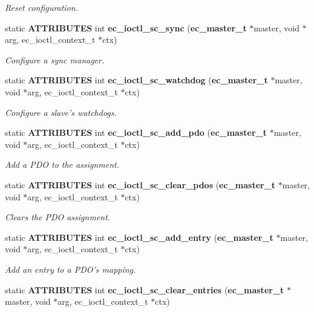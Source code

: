 \begin{DoxyCompactItemize}
\begin{DoxyCompactList}\small\item\em Reset configuration. \end{DoxyCompactList}\item 
static {\bf A\-T\-T\-R\-I\-B\-U\-T\-E\-S} int {\bf ec\-\_\-ioctl\-\_\-sc\-\_\-sync} ({\bf ec\-\_\-master\-\_\-t} $\ast$master, void $\ast$arg, ec\-\_\-ioctl\-\_\-context\-\_\-t $\ast$ctx)
\begin{DoxyCompactList}\small\item\em Configure a sync manager. \end{DoxyCompactList}\item 
static {\bf A\-T\-T\-R\-I\-B\-U\-T\-E\-S} int {\bf ec\-\_\-ioctl\-\_\-sc\-\_\-watchdog} ({\bf ec\-\_\-master\-\_\-t} $\ast$master, void $\ast$arg, ec\-\_\-ioctl\-\_\-context\-\_\-t $\ast$ctx)
\begin{DoxyCompactList}\small\item\em Configure a slave's watchdogs. \end{DoxyCompactList}\item 
static {\bf A\-T\-T\-R\-I\-B\-U\-T\-E\-S} int {\bf ec\-\_\-ioctl\-\_\-sc\-\_\-add\-\_\-pdo} ({\bf ec\-\_\-master\-\_\-t} $\ast$master, void $\ast$arg, ec\-\_\-ioctl\-\_\-context\-\_\-t $\ast$ctx)
\begin{DoxyCompactList}\small\item\em Add a P\-D\-O to the assignment. \end{DoxyCompactList}\item 
static {\bf A\-T\-T\-R\-I\-B\-U\-T\-E\-S} int {\bf ec\-\_\-ioctl\-\_\-sc\-\_\-clear\-\_\-pdos} ({\bf ec\-\_\-master\-\_\-t} $\ast$master, void $\ast$arg, ec\-\_\-ioctl\-\_\-context\-\_\-t $\ast$ctx)
\begin{DoxyCompactList}\small\item\em Clears the P\-D\-O assignment. \end{DoxyCompactList}\item 
static {\bf A\-T\-T\-R\-I\-B\-U\-T\-E\-S} int {\bf ec\-\_\-ioctl\-\_\-sc\-\_\-add\-\_\-entry} ({\bf ec\-\_\-master\-\_\-t} $\ast$master, void $\ast$arg, ec\-\_\-ioctl\-\_\-context\-\_\-t $\ast$ctx)
\begin{DoxyCompactList}\small\item\em Add an entry to a P\-D\-O's mapping. \end{DoxyCompactList}\item 
static {\bf A\-T\-T\-R\-I\-B\-U\-T\-E\-S} int {\bf ec\-\_\-ioctl\-\_\-sc\-\_\-clear\-\_\-entries} ({\bf ec\-\_\-master\-\_\-t} $\ast$master, void $\ast$arg, ec\-\_\-ioctl\-\_\-context\-\_\-t $\ast$ctx)

\end{DoxyCompactItemize}
